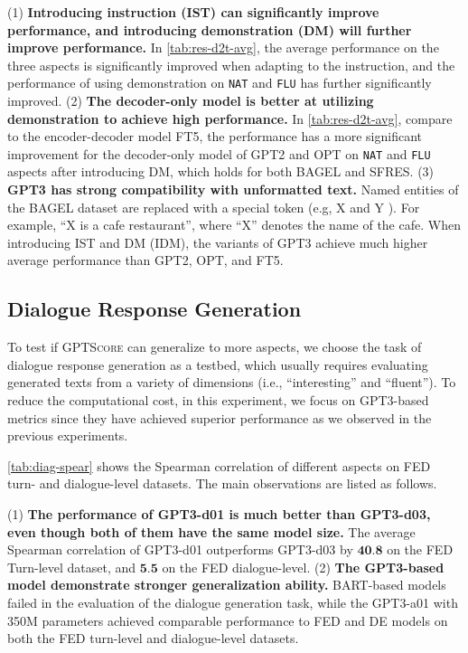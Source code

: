     (1) \textbf{Introducing instruction (IST) can significantly improve performance, and introducing demonstration (DM) will further improve performance.} In \autoref{tab:res-d2t-avg}, the average performance on the three aspects is significantly improved when adapting to the instruction, and the performance of using demonstration on \texttt{NAT} and \texttt{FLU} has further significantly improved. (2) \textbf{The decoder-only model is better at utilizing demonstration to achieve high performance.} In \autoref{tab:res-d2t-avg}, compare to the encoder-decoder model FT5, the performance has a more significant improvement for the decoder-only model of GPT2 and OPT on \texttt{NAT} and \texttt{FLU} aspects after introducing DM, which holds for both BAGEL and SFRES. (3) \textbf{GPT3 has strong compatibility with unformatted text.} Named entities of the BAGEL dataset are replaced with a special token (e.g, X and Y ). For example, ``X is a cafe restaurant'', where ``X'' denotes the name of the cafe. When introducing IST and DM (IDM), the variants of GPT3 achieve much higher average performance than GPT2, OPT, and FT5.

\subsection{Dialogue Response Generation}

To test if \textsc{GPTScore} can generalize to more aspects, we choose the task of dialogue response generation as a testbed, which usually requires evaluating generated texts from a variety of dimensions (i.e., ``interesting'' and ``fluent''). To reduce the computational cost, in this experiment, we focus on GPT3-based metrics since they have achieved superior performance as we observed in the previous experiments.

\autoref{tab:diag-spear} shows the Spearman correlation of different aspects on FED turn- and dialogue-level datasets. The main observations are listed as follows.

    (1) \textbf{The performance of GPT3-d01 is much better than GPT3-d03, even though both of them have the same model size.} The average Spearman correlation of GPT3-d01 outperforms GPT3-d03 by $\textbf{40.8}$ on the FED Turn-level dataset, and $\textbf{5.5}$ on the FED dialogue-level. (2)  \textbf{The GPT3-based model demonstrate stronger generalization ability.} BART-based models failed in the evaluation of the dialogue generation task, while the GPT3-a01 with 350M parameters achieved comparable performance to FED and DE models on both the FED turn-level and dialogue-level datasets.

